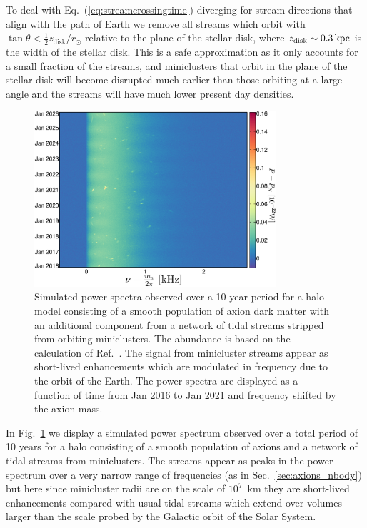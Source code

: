 To deal with Eq.~(\ref{eq:streamcrossingtime}) diverging for stream directions that align with the path of Earth we remove all streams which orbit with $\tan \theta<\frac{1}{2}z_\textrm{disk}/r_\odot$ relative to the plane of the stellar disk, where $z_\textrm{disk}\sim 0.3\,{\rm kpc}$ is the width of the stellar disk. This is a safe approximation as it only accounts for a small fraction of the streams, and miniclusters that orbit in the plane of the stellar disk will become disrupted much earlier than those orbiting at a large angle and the streams will have much lower present day densities.

\begin{figure}
\begin{center}
	\includegraphics[width=0.8\textwidth]{Figures/miniclusterpowerspectrum.eps}
    \caption[Simulated signal from miniclusters]{Simulated power spectra observed over a 10 year period for a halo model consisting of a smooth population of axion dark matter with an additional component from a network of tidal streams stripped from orbiting miniclusters. The abundance is based on the calculation of Ref.~\cite{Tinyakov:2015cgg}. The signal from minicluster streams appear as short-lived enhancements which are modulated in frequency due to the orbit of the Earth. The power spectra are displayed as a function of time from Jan 2016 to Jan 2021 and frequency shifted by the axion mass.}\label{fig:miniclusterpowerspectrum}
\end{center}
\end{figure}


In Fig.~\ref{fig:miniclusterpowerspectrum} we display a simulated power spectrum observed over a total period of 10 years for a halo consisting of a smooth population of axions and a network of tidal streams from miniclusters. The streams appear as peaks in the power spectrum over a very narrow range of frequencies (as in Sec.~\ref{sec:axions_nbody}) but here since minicluster radii are on the scale of $10^7$~km they are short-lived enhancements compared with usual tidal streams which extend over volumes larger than the scale probed by the Galactic orbit of the Solar System. 

